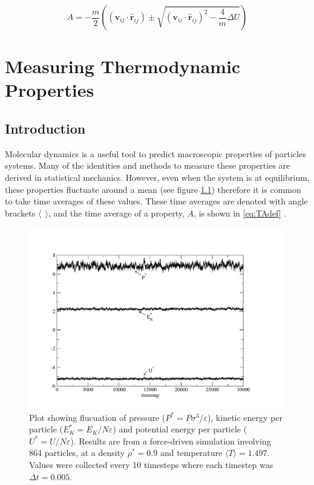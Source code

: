 \documentclass[12pt]{UoAthesis}
\begin{document}
\begin{equation}
  \label{eq:changeMomentum}
  A = -\frac{m}{2}\left((\mathbf{v}_{ij}\cdot\mathbf{\hat{r}}_{ij}) \pm
  \sqrt{(\mathbf{v}_{ij}\cdot\mathbf{\hat{r}}_{ij})^2 - \frac{4}{m}\Delta U}\right)
\end{equation}
\newpage

\newpage

\chapter{Measuring Thermodynamic Properties}
\section{Introduction}
Molecular dynamics is a useful tool to predict macroscopic properties
of particles systems.  Many of the identities and methods to measure
these properties are derived in statistical mechanics.  However, even
when the system is at equilibrium, these properties fluctuate around a
mean (see figure \ref{fig:fluctuations}) therefore it is common to
take time averages of these values. These time averages are denoted
with angle brackets $\langle\:\: \rangle$, and the time average of a
property, $A$, is shown in \eqref{eq:TAdef} \cite{Haile1997}.

\begin{figure}[htp] 
  \begin{center}
    \includegraphics[clip,width=\textwidth]{figures/energyplot} 
    \caption{\label{fig:fluctuations} Plot showing flucuation of pressure
      ($P^*=P\sigma^3/\varepsilon$), kinetic energy per particle
      ($E_K^*=E_K/N\varepsilon$) and potential energy per particle
      ($U^*=U/N\varepsilon$).  Results are from a force-driven simulation
      involving 864 particles, at a density $\rho^*=0.9$ and
      temperature $\langle T\rangle=1.497$. Values were collected
      every 10 timesteps where each timestep was $\Delta t = 0.005$.}
  \end{center}
\end{figure}
\end{document}
